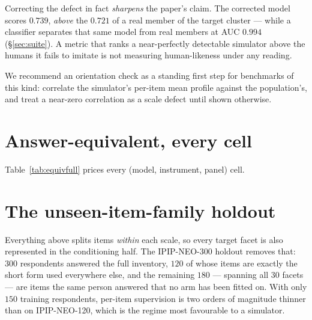 \documentclass[11pt]{article}
\begin{document}
Correcting the defect in fact \emph{sharpens} the paper's claim. The corrected
model scores $0.739$, \emph{above} the $0.721$ of a real member of the target
cluster --- while a classifier separates that same model from real members at AUC
$0.994$ (\S\ref{sec:suite}). A metric that ranks a near-perfectly detectable
simulator above the humans it fails to imitate is not measuring human-likeness
under any reading.

We recommend an orientation check as a standing first step for benchmarks of this
kind: correlate the simulator's per-item mean profile against the population's,
and treat a near-zero correlation as a scale defect until shown otherwise.


\section{Answer-equivalent, every cell}
\label{app:equivfull}

Table~\ref{tab:equivfull} prices every (model, instrument, panel) cell.

\begin{table}[ht]\centering\footnotesize

\caption{Answer-equivalent by inventory.}
\label{tab:equivcorpus}
\end{table}

\begin{table}[ht]\centering\tiny

\caption{Answer-equivalent for all cells. $m^{*}$ is the integer
crossing, $m^{*}_{\mathrm{interp}}$ its interpolation between the
bracketing budgets.}
\label{tab:equivfull}
\end{table}

\section{The unseen-item-family holdout}
\label{app:transfer}

Everything above splits items \emph{within} each scale, so every target facet is
also represented in the conditioning half. The IPIP-NEO-300 holdout removes that:
$300$ respondents answered the full inventory, $120$ of whose items are exactly
the short form used everywhere else, and the remaining $180$ --- spanning all $30$
facets --- are items the same person answered that no arm has been fitted on. With
only $150$ training respondents, per-item supervision is two orders of magnitude
thinner than on IPIP-NEO-120, which is the regime most favourable to a simulator.
\end{document}
